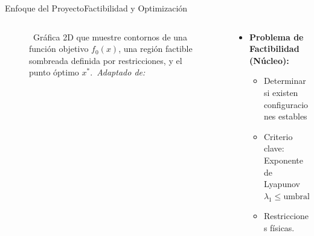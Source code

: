 \begin{frame}{Enfoque del Proyecto}{Factibilidad y Optimización}
    \begin{columns}
        \begin{column}{0.4\textwidth}
            \centering
            \begin{figure}[H]
                \centering
                \vspace{-0.25cm}
                \caption{\tiny~Gráfica 2D que muestre contornos de una función objetivo $f_0(x)$,
                        una región factible sombreada definida por restricciones, y el punto óptimo $x^*$.\ \textit{Adaptado de:}~\cite{BoydVandenbergheSlides2023}}%
                \label{fig:factibility_optimization}
            \end{figure}
        \end{column}
        \begin{column}{0.6\textwidth}
            \small
            \begin{itemize}
                \item \textbf{Problema de Factibilidad (Núcleo):}
                \begin{itemize}
                    \item Determinar si existen configuraciones estables
                    \item Criterio clave: Exponente de Lyapunov $\lambda_1 \leq \text{umbral}$
                    \item Restricciones físicas. %

\end{itemize}
\end{itemize}
\end{column}
\end{columns}
\end{frame}
